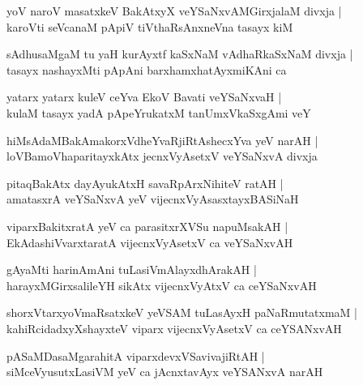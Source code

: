 \begin{shloka}
yoV naroV masatxkeV BakAtxyX veYSaNxvAMGirxjalaM divxja |\\
karoVti seVcanaM pApiV tiVthaRsAnxneVna tasayx kiM
\end{shloka}

\begin{shloka}
sAdhusaMgaM tu yaH kurAyxtf kaSxNaM vAdhaRkaSxNaM divxja |\\
tasayx nashayxMti pApAni barxhamxhatAyxmiKAni ca 
\end{shloka}

\begin{shloka}
yatarx yatarx kuleV ceYva EkoV Bavati veYSaNxvaH |\\
kulaM tasayx yadA pApeYrukatxM tanUmxVkaSxgAmi veY
\end{shloka}

\begin{shloka}
hiMsAdaMBakAmakorxVdheYvaRjiRtAshecxYva yeV narAH |\\
loVBamoVhaparitayxkAtx jecnxVyAsetxV veYSaNxvA divxja
\end{shloka}

\begin{shloka}
pitaqBakAtx dayAyukAtxH savaRpArxNihiteV ratAH |\\
amatasxrA veYSaNxvA yeV vijecnxVyAsasxtayxBASiNaH 
\end{shloka}

\begin{shloka}
viparxBakitxratA yeV ca parasitxrXVSu napuMsakAH |\\
EkAdashiVvarxtaratA vijecnxVyAsetxV ca veYSaNxvAH 
\end{shloka}

\begin{shloka}
gAyaMti harinAmAni tuLasiVmAlayxdhArakAH |\\
harayxMGirxsalileYH sikAtx vijecnxVyAtxV ca ceYSaNxvAH 
\end{shloka}

\begin{shloka}
shorxVtarxyoVmaRsatxkeV yeVSAM tuLasAyxH paNaRmutatxmaM |\\
kahiRcidadxyXshayxteV viparx vijecnxVyAsetxV ca ceYSANxvAH
\end{shloka}

\begin{shloka}
pASaMDasaMgarahitA viparxdevxVSavivajiRtAH |\\
siMceVyusutxLasiVM yeV ca jAcnxtavAyx veYSANxvA narAH 
\end{shloka}

